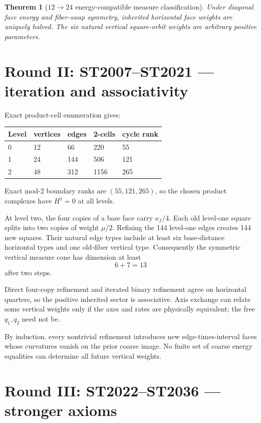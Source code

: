 \documentclass[11pt,a4paper]{article}
\newtheorem{theorem}{Theorem}\newcommand{\status}[1]{\textsf{[#1]}}
\begin{document}
\begin{theorem}[$12\to24$ energy-compatible measure classification]
Under diagonal face energy and fiber-swap symmetry, inherited horizontal face
weights are uniquely halved.  The six natural vertical square-orbit weights
are arbitrary positive parameters.
\end{theorem}

\section{Round II: ST2007--ST2021 --- iteration and associativity}

Exact product-cell enumeration gives:
\begin{longtable}{@{}p{}p{}p{}p{}p{}@{}}
\toprule
Level & vertices & edges & 2-cells & cycle rank \\
\midrule\endhead
0 & 12 & 66 & 220 & 55 \\
1 & 24 & 144 & 506 & 121 \\
2 & 48 & 312 & 1156 & 265 \\
\bottomrule
\end{longtable}
Exact mod-2 boundary ranks are $(55,121,265)$, so the chosen product complexes
have $H^1=0$ at all levels.

At level two, the four copies of a base face carry $\kappa_f/4$.  Each old
level-one square splits into two copies of weight $\mu/2$.  Refining the 144
level-one edges creates 144 new squares.  Their natural edge types include at
least six base-distance horizontal types and one old-fiber vertical type.
Consequently the symmetric vertical measure cone has dimension at least
\[
6+7=13
\]
after two steps.

Direct four-copy refinement and iterated binary refinement agree on horizontal
quarters, so the positive inherited sector is associative.  Axis exchange can
relate some vertical weights only if the axes and rates are physically
equivalent; the free $q_1,q_2$ need not be.

By induction, every nontrivial refinement introduces new edge-times-interval
faces whose curvatures vanish on the prior coarse image.  No finite set of
coarse energy equalities can determine all future vertical weights.

\section{Round III: ST2022--ST2036 --- stronger axioms}
\end{document}
